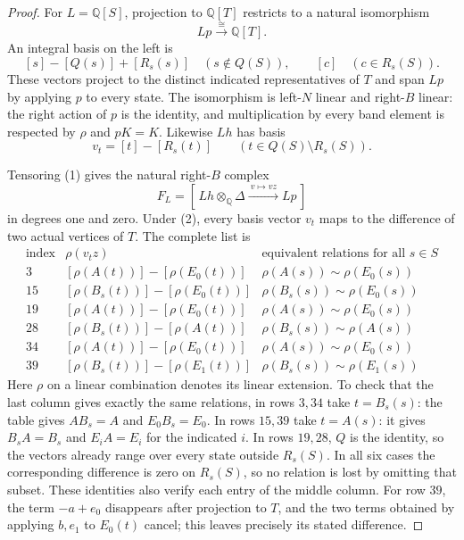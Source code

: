 \begin{proof}
For $L=\mathbb Q[S]$, projection to $\mathbb Q[T]$
restricts to a natural isomorphism
\[
 Lp\xrightarrow{\cong}\mathbb Q[T].                    \tag{2}
\]
An integral basis on the left is
\[
 [s]-[Q(s)]+[R_s(s)]\quad(s\notin Q(S)),
 \qquad[c]\quad(c\in R_s(S)).
\]
These vectors project to the distinct indicated representatives
of $T$ and span $Lp$ by applying $p$ to every state.
The isomorphism is left-$N$ linear and right-$B$ linear:
the right action of $p$ is the identity, and multiplication
by every band element is respected by $\rho$ and $pK=K$.
Likewise $Lh$ has basis
\[
 v_t=[t]-[R_s(t)]\qquad(t\in Q(S)\setminus R_s(S)).
\]

Tensoring (1) gives the natural right-$B$ complex
\[
 F_L=[\,Lh\otimes_{\mathbb Q}\Delta
                   \xrightarrow{\ v\mapsto vz\ }Lp\,]
\]
in degrees one and zero.  Under (2), every basis vector
$v_t$ maps to the difference of two actual vertices of $T$.
The complete list is
\[
\begin{array}{c|c|c}
\text{index}&\rho(v_tz)&\text{equivalent relations for all }s\in S\\\hline
3&[\rho(A(t))]-[\rho(E_0(t))]&\rho(A(s))\sim\rho(E_0(s))\\
15&[\rho(B_s(t))]-[\rho(E_0(t))]&\rho(B_s(s))\sim\rho(E_0(s))\\
19&[\rho(A(t))]-[\rho(E_0(t))]&\rho(A(s))\sim\rho(E_0(s))\\
28&[\rho(B_s(t))]-[\rho(A(t))]&\rho(B_s(s))\sim\rho(A(s))\\
34&[\rho(A(t))]-[\rho(E_0(t))]&\rho(A(s))\sim\rho(E_0(s))\\
39&[\rho(B_s(t))]-[\rho(E_1(t))]&\rho(B_s(s))\sim\rho(E_1(s))
\end{array}                                                    \tag{3}
\]
Here $\rho$ on a linear combination denotes its linear extension.
To check that the last column gives exactly the same relations,
in rows $3,34$ take $t=B_s(s)$: the table gives
$AB_s=A$ and $E_0B_s=E_0$.  In rows $15,39$ take
$t=A(s)$: it gives $B_sA=B_s$ and $E_iA=E_i$ for
the indicated $i$.  In rows $19,28$, $Q$ is the identity,
so the vectors already range over every state outside $R_s(S)$.
In all six cases the corresponding difference is zero on
$R_s(S)$, so no relation is lost by omitting that subset.
These identities also verify each entry of the middle column.
For row $39$, the term $-a+e_0$ disappears after projection
to $T$, and the two terms obtained by applying $b,e_1$
to $E_0(t)$ cancel; this leaves precisely its stated difference.


\end{proof}
